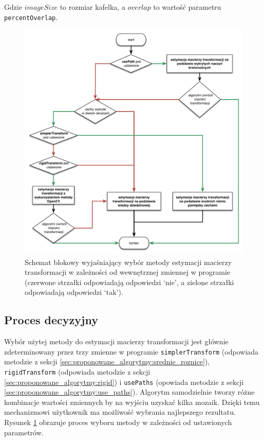 Gdzie $imageSize$ to rozmiar kafelka, a $overlap$ to wartość parametru \texttt{percentOverlap}.

\begin{figure}[H]
  \centering
  \includegraphics[width=\textwidth]{gfx/decision_model}
  \caption{Schemat blokowy wyjaśniający wybór metody estymacji macierzy transformacji w zależności od wewnętrznej zmiennej w programie (czerwone strzałki odpowiadają odpowiedzi `nie', a zielone strzałki odpowiadają odpowiedzi `tak').}
  \label{fig:proponowane_algorytmy:decision_model}
\end{figure}

\subsection{Proces decyzyjny}
\label{sec:proponowane_algorytmy:proces_decyzyjny}

Wybór użytej metody do estymacji macierzy transformacji jest głównie zdeterminowany przez trzy zmienne w programie \texttt{simplerTransform} (odpowiada metodzie z sekcji \ref{sec:proponowane_algorytmy:srednie_roznice}), \texttt{rigidTransform} (odpowiada metodzie z sekcji \ref{sec:proponowane_algorytmy:rigid}) i \texttt{usePaths} (opowiada metodzie z sekcji \ref{sec:proponowane_algorytmy:use_paths}). Algorytm samodzielnie tworzy różne kombinacje wartości zmiennych by na wyjściu uzyskać kilka mozaik. Dzięki temu mechanizmowi użytkownik ma możliwość wybrania najlepszego rezultatu. Rysunek \ref{fig:proponowane_algorytmy:decision_model} obrazuje proces wyboru metody w zależności od ustawionych parametrów.

